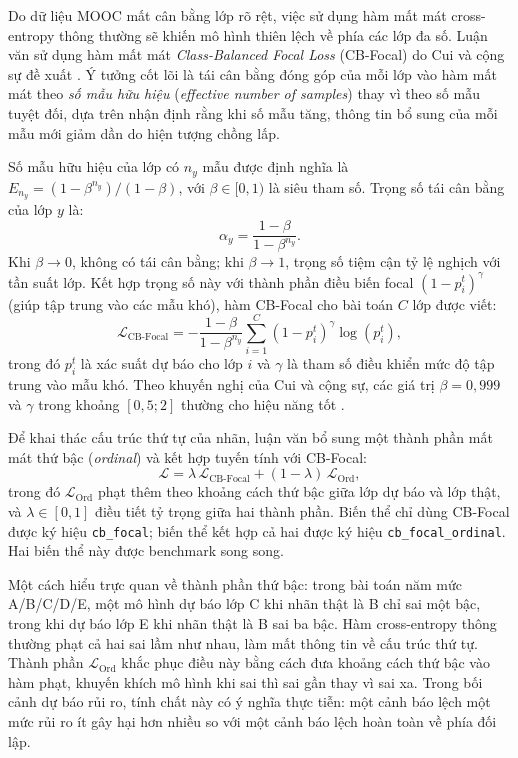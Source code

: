 Do dữ liệu MOOC mất cân bằng lớp rõ rệt, việc sử dụng hàm mất mát cross-entropy thông thường sẽ khiến mô hình thiên lệch về phía các lớp đa số. Luận văn sử dụng hàm mất mát \textit{Class-Balanced Focal Loss} (CB-Focal) do Cui và cộng sự đề xuất \cite{Cui2019}. Ý tưởng cốt lõi là tái cân bằng đóng góp của mỗi lớp vào hàm mất mát theo \emph{số mẫu hữu hiệu} (\textit{effective number of samples}) thay vì theo số mẫu tuyệt đối, dựa trên nhận định rằng khi số mẫu tăng, thông tin bổ sung của mỗi mẫu mới giảm dần do hiện tượng chồng lấp.

Số mẫu hữu hiệu của lớp có $n_y$ mẫu được định nghĩa là $E_{n_y} = (1 - \beta^{n_y})/(1 - \beta)$, với $\beta \in [0, 1)$ là siêu tham số. Trọng số tái cân bằng của lớp $y$ là:
\begin{equation}
\alpha_y = \frac{1 - \beta}{1 - \beta^{n_y}}.
\end{equation}
Khi $\beta \to 0$, không có tái cân bằng; khi $\beta \to 1$, trọng số tiệm cận tỷ lệ nghịch với tần suất lớp. Kết hợp trọng số này với thành phần điều biến focal $(1 - p_i^t)^\gamma$ (giúp tập trung vào các mẫu khó), hàm CB-Focal cho bài toán $C$ lớp được viết:
\begin{equation}
\mathcal{L}_{\text{CB-Focal}} = -\frac{1 - \beta}{1 - \beta^{n_y}} \sum_{i=1}^{C} (1 - p_i^t)^{\gamma} \log(p_i^t),
\label{eq:cbfocal}
\end{equation}
trong đó $p_i^t$ là xác suất dự báo cho lớp $i$ và $\gamma$ là tham số điều khiển mức độ tập trung vào mẫu khó. Theo khuyến nghị của Cui và cộng sự, các giá trị $\beta = 0{,}999$ và $\gamma$ trong khoảng $[0{,}5; 2]$ thường cho hiệu năng tốt \cite{Cui2019}.

Để khai thác cấu trúc thứ tự của nhãn, luận văn bổ sung một thành phần mất mát thứ bậc (\textit{ordinal}) và kết hợp tuyến tính với CB-Focal:
\begin{equation}
\mathcal{L} = \lambda \, \mathcal{L}_{\text{CB-Focal}} + (1 - \lambda) \, \mathcal{L}_{\text{Ord}},
\label{eq:totalloss}
\end{equation}
trong đó $\mathcal{L}_{\text{Ord}}$ phạt thêm theo khoảng cách thứ bậc giữa lớp dự báo và lớp thật, và $\lambda \in [0, 1]$ điều tiết tỷ trọng giữa hai thành phần. Biến thể chỉ dùng CB-Focal được ký hiệu \texttt{cb\_focal}; biến thể kết hợp cả hai được ký hiệu \texttt{cb\_focal\_ordinal}. Hai biến thể này được benchmark song song.

Một cách hiểu trực quan về thành phần thứ bậc: trong bài toán năm mức A/B/C/D/E, một mô hình dự báo lớp C khi nhãn thật là B chỉ sai một bậc, trong khi dự báo lớp E khi nhãn thật là B sai ba bậc. Hàm cross-entropy thông thường phạt cả hai sai lầm như nhau, làm mất thông tin về cấu trúc thứ tự. Thành phần $\mathcal{L}_{\text{Ord}}$ khắc phục điều này bằng cách đưa khoảng cách thứ bậc vào hàm phạt, khuyến khích mô hình khi sai thì sai gần thay vì sai xa. Trong bối cảnh dự báo rủi ro, tính chất này có ý nghĩa thực tiễn: một cảnh báo lệch một mức rủi ro ít gây hại hơn nhiều so với một cảnh báo lệch hoàn toàn về phía đối lập.

